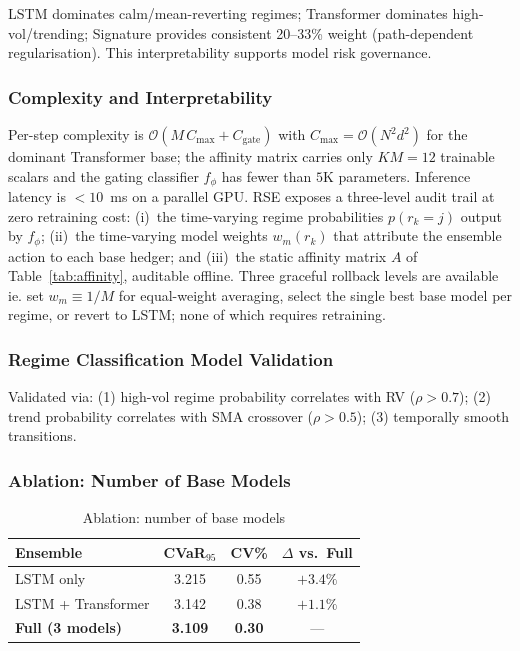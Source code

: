 \documentclass[11pt,oneside]{report}
\begin{document}
LSTM dominates calm/mean-reverting regimes; Transformer dominates high-vol/trending; Signature provides consistent 20--33\% weight (path-dependent regularisation). This interpretability supports model risk governance.

\subsubsection{Complexity and Interpretability}

Per-step complexity is $\mathcal{O}(M\,C_{\max} + C_{\text{gate}})$ with $C_{\max}=\mathcal{O}(N^2 d^2)$ for the dominant Transformer base; the affinity matrix carries only $KM = 12$ trainable scalars and the gating classifier $f_\phi$ has fewer than $5$K parameters.  Inference latency is $<10$~ms on a parallel GPU.  RSE exposes a three-level audit trail at zero retraining cost: (i)~the time-varying regime probabilities $p(r_k=j)$ output by $f_\phi$; (ii)~the time-varying model weights $w_m(r_k)$ that attribute the ensemble action to each base hedger; and (iii)~the static affinity matrix $A$ of Table~\ref{tab:affinity}, auditable offline.  Three graceful rollback levels are available ie. set $w_m \equiv 1/M$ for equal-weight averaging, select the single best base model per regime, or revert to LSTM; none of which requires retraining.  
\subsubsection{Regime Classification Model Validation}

Validated via: (1) high-vol regime probability correlates with RV ($\rho > 0.7$); (2) trend probability correlates with SMA crossover ($\rho > 0.5$); (3) temporally smooth transitions.
\subsubsection{Ablation: Number of Base Models}

\begin{table}[H]
\centering
\caption{Ablation: number of base models}
\label{tab:ablation_models}
\small
\begin{tabular}{lccc}
\toprule
\textbf{Ensemble} & \textbf{CVaR$_{95}$} & \textbf{CV\%} & \textbf{$\Delta$ vs.\ Full} \\
\midrule
LSTM only & 3.215 & 0.55 & $+3.4\%$ \\
LSTM + Transformer & 3.142 & 0.38 & $+1.1\%$ \\
\textbf{Full (3 models)} & \textbf{3.109} & \textbf{0.30} & --- \\
\bottomrule
\end{tabular}
\end{table}
\end{document}
